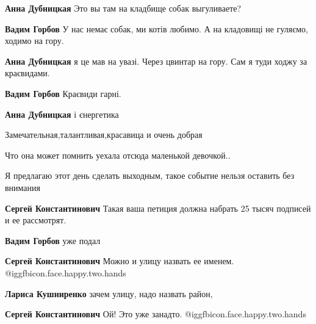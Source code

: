 \begin{itemize}
\begin{itemize}
\begin{itemize}
\textbf{Анна Дубницкая} Это вы там на кладбище собак выгуливаете?

\textbf{Вадим Горбов} У нас немає собак, ми котів любимо. А на кладовищі не гуляємо, ходимо на гору.

\textbf{Анна Дубницкая} я це мав на увазі. Через цвинтар на гору. Сам я туди ходжу за краєвидами.

\textbf{Вадим Горбов} Краєвиди гарні.

\textbf{Анна Дубницкая} і єнергетика
\end{itemize} %

\end{itemize} %

Замечательная,талантливая,красавица и очень добрая

Что она может помнить уехала отсюда маленькой девочкой..

Я предлагаю этот день сделать выходным, такое событие нельзя оставить без внимания

\begin{itemize} %
\textbf{Сергей Константинович} Такая ваша петиция должна набрать 25 тысяч подписей и ее рассмотрят.

\textbf{Вадим Горбов} уже подал

\textbf{Сергей Константинович} Можно и улицу назвать ее именем. @igg{fbicon.face.happy.two.hands} 

\textbf{Лариса Кушниренко} зачем улицу, надо назвать район,

\textbf{Сергей Константинович} Ой! Это уже занадто. @igg{fbicon.face.happy.two.hands} 
\end{itemize} %

\end{itemize} %
